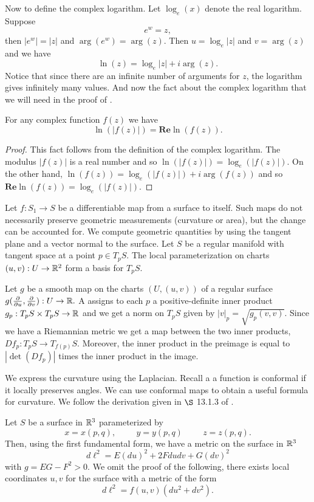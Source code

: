 Now to define the complex logarithm. Let $\log_e(x)$ denote the real logarithm.
Suppose $$e^w=z,$$
then $|e^w|=|z|$ and $\arg(e^w)=\arg(z)$. Then $u=\log_e|z|$ and $v=\arg(z)$
and we have $$\ln(z)=\log_e|z|+i\arg(z).$$
Notice that since there are an infinite number of arguments for $z$, the logarithm
gives infinitely many values. And now the fact about the complex
logarithm that we will need in the proof of .
\begin{lemma}\label{lem:log-fact}
	For any complex function $f(z)$ we have
	$$\ln(|f(z)|)=\textbf{Re}\ln(f(z)).$$
\end{lemma}
\begin{proof}
	This fact follows from the definition of the complex logarithm.
	The modulus $|f(z)|$ is a real number and so $\ln(|f(z)|)=\log_e(|f(z)|)$.
	On the other hand, $\ln(f(z))=\log_e(|f(z)|)+i\arg(f(z))$ and so
	$\textbf{Re}\ln(f(z))=\log_e(|f(z)|).$
\end{proof}
Let $f:S_1\to S$ be a differentiable map from a surface to itself.
Such maps do not necessarily preserve geometric measurements (curvature or area), but the change
can be accounted for. We compute geometric quantities by using the tangent plane and
a vector normal to the surface.
Let $S$ be a regular manifold with tangent space at a point $p\in T_pS.$
The local parameterization on charts $(u,v):U\to \mathbb{R}^2$ form a basis for
$T_pS$.

Let $g$ be a smooth map on the charts $(U, (u,v))$ of a regular surface
$g(\frac{\partial}{\partial u},\frac{\partial}{\partial v}):U\to \mathbb{R}.$
A  assigns to each $p$ a positive-definite inner product
$g_p:T_pS\times T_pS \to \mathbb{R}$ and we get a norm on $T_pS$ given by
$|v|_p=\sqrt{g_p(v,v)}$.
Since we have a Riemannian metric we get a map between the two inner products,
$Df_p:T_pS\to T_{f(p)}S$. Moreover, the inner product in the preimage is equal
to $|\det(Df_p)|$ times the inner product in the image.


We express the curvature using the Laplacian.
Recall a a function is conformal if it locally preserves angles.
We can use conformal maps to obtain a useful formula for curvature.
We follow the derivation given in $\S$ 13.1.3 of \cite{dubrovin_modern_1984}.

Let $S$ be a surface in $\mathbb{R}^3$ parameterized by
$$x=x(p,q), \hspace{1cm}  y=y(p,q)  \hspace{1cm} z=z(p,q).$$
Then, using the  first fundamental form, we have a metric on the surface in $\mathbb{R}^3$
$$d\ell^2=E(du)^2+2Fdudv + G(dv)^2$$
with $g=EG-F^2>0.$ 
We omit the proof of the following, there exists local coordinates $u,v$ for the surface with a metric of the form
$$d\ell^2=f(u,v)(du^2+dv^2).$$ 

